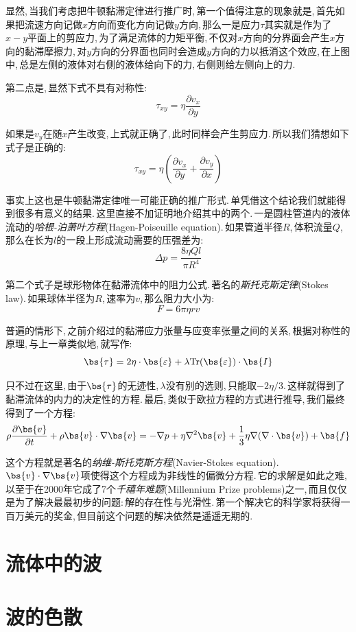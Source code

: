 显然,\,当我们考虑把牛顿黏滞定律进行推广时,\,第一个值得注意的现象就是,\,首先如果把流速方向记做$x$方向而变化方向记做$y$方向,\,那么一是应力$\tau$其实就是作为了$x-y$平面上的剪应力,\,为了满足流体的力矩平衡,\,不仅对$x$方向的分界面会产生$x$方向的黏滞摩擦力,\,对$y$方向的分界面也同时会造成$y$方向的力以抵消这个效应,\,在上图中,\,总是左侧的液体对右侧的液体给向下的力,\,右侧则给左侧向上的力.

第二点是,\,显然下式不具有对称性:
\[\tau_{xy}=\eta\frac{\partial v_x}{\partial y}\]

如果是$v_y$在随$x$产生改变,\,上式就正确了,\,此时同样会产生剪应力.\,所以我们猜想如下式子是正确的:
\[\tau_{xy}=\eta\left(\frac{\partial v_x}{\partial y}+\frac{\partial v_y}{\partial x}\right)\]

事实上这也是牛顿黏滞定律唯一可能正确的推广形式.\,单凭借这个结论我们就能得到很多有意义的结果.\,这里直接不加证明地介绍其中的两个.\,一是圆柱管道内的液体流动的\emph{哈根-泊萧叶方程}(Hagen-Poiseuille equation).\,如果管道半径$R$,\,体积流量$Q$,\,那么在长为$l$的一段上形成流动需要的压强差为:
\[\Delta p=\frac{8\eta Ql}{\pi R^4}\]

第二个式子是球形物体在黏滞流体中的阻力公式.\,著名的\emph{斯托克斯定律}(Stokes law).\,如果球体半径为$R$,\,速率为$v$,\,那么阻力大小为:
\[F=6\pi\eta rv\]

普遍的情形下,\,之前介绍过的黏滞应力张量与应变率张量之间的关系,\,根据对称性的原理,\,与上一章类似地,\,就写作:
\[\bs{\tau}=2\eta\cdot \bs{\varepsilon}+\lambda {\rm Tr}(\bs{\varepsilon})\cdot \bs{I}\]

只不过在这里,\,由于$\bs{\tau}$的无迹性,\,$\lambda$没有别的选则,\,只能取$-2\eta/3$.\,这样就得到了黏滞流体的内力的决定性的方程.\,最后,\,类似于欧拉方程的方式进行推导,\,我们最终得到了一个方程:
\[\rho\frac{\partial \bs{v}}{\partial t}+\rho\bs{v}\cdot\nabla\bs{v}=-\nabla p+\eta\nabla^2\bs{v}+\frac{1}{3}\eta\nabla(\nabla\cdot\bs{v})+\bs{f}\]

这个方程就是著名的\emph{纳维-斯托克斯方程}(Navier-Stokes equation).\,$\bs{v}\cdot\nabla\bs{v}$项使得这个方程成为非线性的偏微分方程.\,它的求解是如此之难,\,以至于在2000年它成了7个\emph{千禧年难题}(Millennium Prize problems)之一,\,而且仅仅是为了解决最最初步的问题:\,解的存在性与光滑性.\,第一个解决它的科学家将获得一百万美元的奖金,\,但目前这个问题的解决依然是遥遥无期的.




\section{流体中的波}

\section{波的色散}